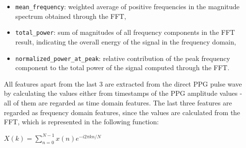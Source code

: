 \begin{itemize}
    \item \texttt{mean\_frequency}: weighted average of positive frequencies in the magnitude spectrum obtained through the FFT,
    \item \texttt{total\_power}: sum of magnitudes of all frequency components in the FFT result, indicating the overall energy of the signal in the frequency domain,
    \item \texttt{normalized\_power\_at\_peak}: relative contribution of the peak frequency component to the total power of the signal computed through the FFT\@.
\end{itemize}

All features apart from the last 3 are extracted from the direct PPG pulse wave by calculating the values either from timestamps of the PPG amplitude values - all of them are regarded as time domain features.
The last three features are regarded as frequency domain features, since the values are calculated from the FFT, which is represented in the following function:

\begin{center}
    \begin{math}
        X(k) = \sum_{n=0}^{N-1} x(n) e^{-i 2\pi kn/N}
    \end{math}
\end{center}

